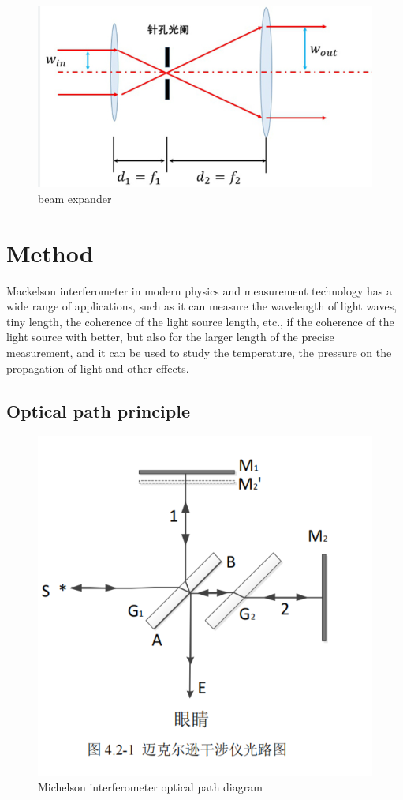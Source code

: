 \documentclass[UTF8]{article}
\begin{document}
\begin{figure}[h]
    \centering
    \includegraphics[width=0.5\linewidth]{FIG3.png}
    \caption{beam expander}
    \label{fig:beam expander}
\end{figure}

        
	\section{Method}
 Mackelson interferometer in modern physics and measurement technology has a wide range of applications, such as it can measure the wavelength of light waves, tiny length, the coherence of the light source length, etc., if the coherence of the light source with better, but also for the larger length of the precise measurement, and it can be used to study the temperature, the pressure on the propagation of light and other effects.
	
 \subsection{Optical path principle}
\begin{figure}[h]
     \centering
     \includegraphics[width=0.5\linewidth]{FIG.png}
     \caption{Michelson interferometer optical path diagram}
 \end{figure}
 
\end{document}
